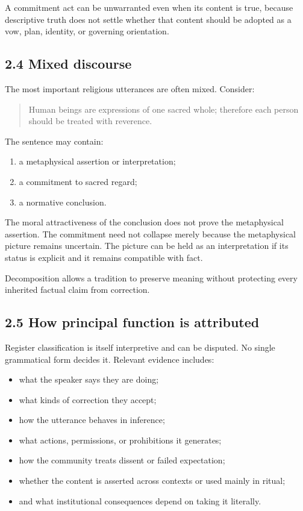 \documentclass[
  11pt,
]{article}
\providecommand{\tightlist}{%
  \setlength{\itemsep}{0pt}\setlength{\parskip}{0pt}}
\begin{document}
A commitment act can be unwarranted even when its content is true,
because descriptive truth does not settle whether that content should be
adopted as a vow, plan, identity, or governing orientation.

\subsection{2.4 Mixed discourse}\label{mixed-discourse}

The most important religious utterances are often mixed. Consider:

\begin{quote}
Human beings are expressions of one sacred whole; therefore each person
should be treated with reverence.
\end{quote}

The sentence may contain:

\begin{enumerate}
\def\labelenumi{\arabic{enumi}.}
\tightlist
\item
  a metaphysical assertion or interpretation;
\item
  a commitment to sacred regard;
\item
  a normative conclusion.
\end{enumerate}

The moral attractiveness of the conclusion does not prove the
metaphysical assertion. The commitment need not collapse merely because
the metaphysical picture remains uncertain. The picture can be held as
an interpretation if its status is explicit and it remains compatible
with fact.

Decomposition allows a tradition to preserve meaning without protecting
every inherited factual claim from correction.

\subsection{2.5 How principal function is
attributed}\label{how-principal-function-is-attributed}

Register classification is itself interpretive and can be disputed. No
single grammatical form decides it. Relevant evidence includes:

\begin{itemize}
\tightlist
\item
  what the speaker says they are doing;
\item
  what kinds of correction they accept;
\item
  how the utterance behaves in inference;
\item
  what actions, permissions, or prohibitions it generates;
\item
  how the community treats dissent or failed expectation;
\item
  whether the content is asserted across contexts or used mainly in
  ritual;
\item
  and what institutional consequences depend on taking it literally.
\end{itemize}
\end{document}
